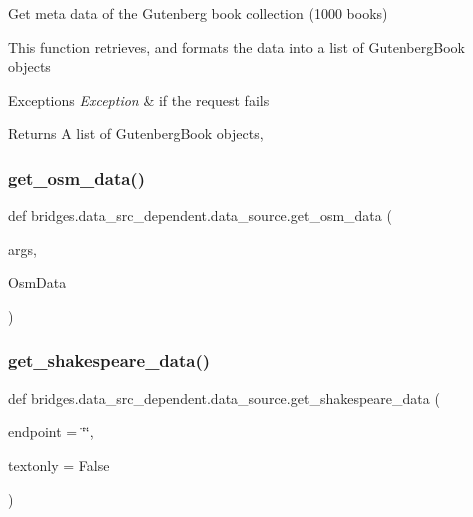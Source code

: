 Get meta data of the Gutenberg book collection (1000 books) 

This function retrieves, and formats the data into a list of Gutenberg\+Book objects


\begin{DoxyExceptions}{Exceptions}
{\em Exception} & if the request fails\\
\hline
\end{DoxyExceptions}
\begin{DoxyReturn}{Returns}
A list of Gutenberg\+Book objects, 
\end{DoxyReturn}
\mbox{\label{namespacebridges_1_1data__src__dependent_1_1data__source_acbb9052453e120b99ac32b27fd99bb07}} 
\subsubsection{\texorpdfstring{get\+\_\+osm\+\_\+data()}{get\_osm\_data()}}
{\footnotesize\ttfamily def bridges.\+data\+\_\+src\+\_\+dependent.\+data\+\_\+source.\+get\+\_\+osm\+\_\+data (\begin{DoxyParamCaption}\item[{}]{args,  }\item[{}]{Osm\+Data }\end{DoxyParamCaption})}

\mbox{\label{namespacebridges_1_1data__src__dependent_1_1data__source_a141593343ceef42e35072b3151a8b2db}} 
\subsubsection{\texorpdfstring{get\+\_\+shakespeare\+\_\+data()}{get\_shakespeare\_data()}}
{\footnotesize\ttfamily def bridges.\+data\+\_\+src\+\_\+dependent.\+data\+\_\+source.\+get\+\_\+shakespeare\+\_\+data (\begin{DoxyParamCaption}\item[{}]{endpoint = {\ttfamily \char`\"{}\char`\"{}},  }\item[{}]{textonly = {\ttfamily False} }\end{DoxyParamCaption})}



